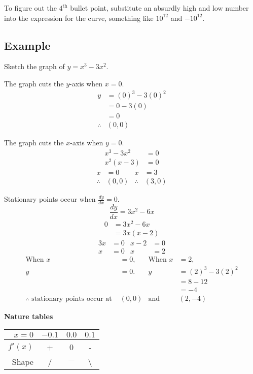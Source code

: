 To figure out the $4^{\text{th}}$ bullet point, substitute an absurdly high and low number into the expression for the curve, something like $10^{12}$ and $-10^{12}$.

\subsection{Example}
Sketch the graph of $y=x^3-3x^2$.

\medskip

The graph cuts the $y$-axis when $x=0$.
\begin{align*}
	y&=(0)^3-3(0)^2\\
	&=0-3(0)\\
	&= 0\\
	\therefore&(0,0)
\end{align*}

The graph cuts the $x$-axis when $y=0$.
\begin{align*}
	x^3-3x^2&=0\\
	x^2(x-3)&=0
\end{align*}
\begin{align*}
	x&=0 & x&=3\\
	\therefore&(0,0) & \therefore&(3,0)
\end{align*}

Stationary points occur when $\frac{dy}{dx} = 0$.
\begin{equation*}
	\frac{dy}{dx} = 3x^2-6x
\end{equation*}
\begin{align*}
	0 &= 3x^2-6x\\
	&=3x(x-2)
\end{align*}
\begin{align*}
	3x&=0 & x-2&=0\\
	x&=0 & x&=2
\end{align*}
\begin{align*}
	\text{When } x&=0\text{,} & \text{When } x&=2\text{,}\\
	y&=0\text{.} & y&=(2)^3-3(2)^2\\
	& & &=8-12\\
	& & &=-4\\
	\therefore\text{ stationary points occur at } &(0,0) & \text{and }&(2,-4)
\end{align*}

\textbf{Nature tables}

\medskip

\begin{tabular}{r | c c c}
	$x=0$ & $-0.1$ & $0.0$ & $0.1$\\
	\hline
	$f'(x)$ & + & 0 & -\\
	Shape & / & $^{\text{---}}$ & \textbackslash \\
\end{tabular}

